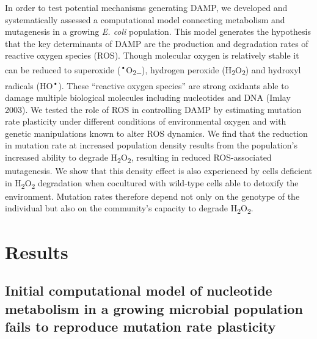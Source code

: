 \documentclass[
  12pt,
  letterpaper,
  DIV=11,
  numbers=noendperiod]{scrreprt}
\begin{document}
In order to test potential mechanisms generating DAMP, we developed and
systematically assessed a computational model connecting metabolism and
mutagenesis in a growing \emph{E. coli} population. This model generates
the hypothesis that the key determinants of DAMP are the production and
degradation rates of reactive oxygen species (ROS). Though molecular
oxygen is relatively stable it can be reduced to superoxide
(\textsuperscript{•}O\textsubscript{2−}), hydrogen peroxide
(H\textsubscript{2}O\textsubscript{2}) and hydroxyl radicals
(HO\textsuperscript{•}). These ``reactive oxygen species'' are strong
oxidants able to damage multiple biological molecules including
nucleotides and DNA (Imlay 2003). We tested the role of ROS in
controlling DAMP by estimating mutation rate plasticity under different
conditions of environmental oxygen and with genetic manipulations known
to alter ROS dynamics. We find that the reduction in mutation rate at
increased population density results from the population's increased
ability to degrade H\textsubscript{2}O\textsubscript{2}, resulting in
reduced ROS-associated mutagenesis. We show that this density effect is
also experienced by cells deficient in
H\textsubscript{2}O\textsubscript{2} degradation when cocultured with
wild-type cells able to detoxify the environment. Mutation rates
therefore depend not only on the genotype of the individual but also on
the community's capacity to degrade
H\textsubscript{2}O\textsubscript{2}.

\hypertarget{results}{%
\section{Results}\label{results}}

\hypertarget{initial-computational-model-of-nucleotide-metabolism-in-a-growing-microbial-population-fails-to-reproduce-mutation-rate-plasticity}{%
\subsection{Initial computational model of nucleotide metabolism in a
growing microbial population fails to reproduce mutation rate
plasticity}\label{initial-computational-model-of-nucleotide-metabolism-in-a-growing-microbial-population-fails-to-reproduce-mutation-rate-plasticity}}
\end{document}
